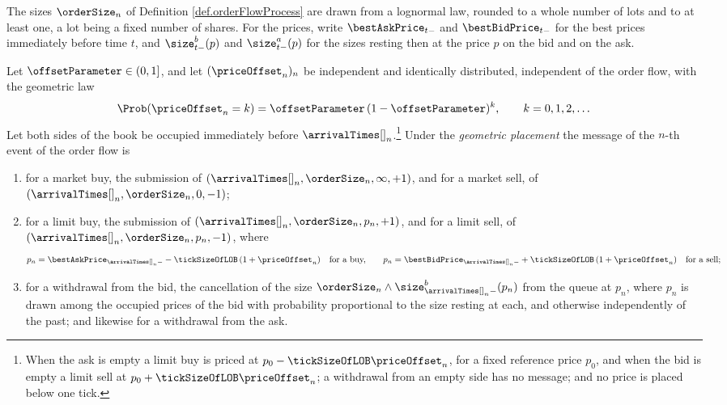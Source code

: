 The sizes $\orderSize_n$ of Definition \ref{def.orderFlowProcess} are drawn from a
lognormal law, rounded to a whole number of lots and to at least one,
a lot being a fixed number of shares.
For the prices,
write $\bestAskPrice_{t-}$ and $\bestBidPrice_{t-}$ for the best prices immediately before
time $t$,
and $\size^{b}_{t-}(p)$ and $\size^{a}_{t-}(p)$ for the sizes resting then at the price $p$
on the bid and on the ask.

\begin{defi}\label{def.geometricPlacement}
 Let $\offsetParameter \in (0,1]$,
 and let $(\priceOffset_n)_n$ be independent and identically distributed,
 independent of the order flow, with the geometric law
 \begin{equation}\label{eq.priceOffset}
  \Prob(\priceOffset_n = k) = \offsetParameter \, (1-\offsetParameter)^{k},
  \qquad k = 0, 1, 2, \dots
 \end{equation}
 Let both sides of the book be occupied immediately before
 $\arrivalTimes[]_n$.\footnote{When
 the ask is empty a limit buy is priced at $p_0 - \tickSizeOfLOB\priceOffset_n$,
 for a fixed reference price $p_0$,
 and when the bid is empty a limit sell at $p_0 + \tickSizeOfLOB\priceOffset_n$;
 a withdrawal from an empty side has no message;
 and no price is placed below one tick.}
 Under the \emph{geometric placement} the message of the $n$-th event of the order flow is
 \begin{enumerate}[label={\emph{\roman{*}}.}]
  \item for a market buy, the submission of
        $(\arrivalTimes[]_n, \orderSize_n, \infty, +1)$,
        and for a market sell, of $(\arrivalTimes[]_n, \orderSize_n, 0, -1)$;
  \item for a limit buy, the submission of $(\arrivalTimes[]_n, \orderSize_n, p_n, +1)$,
        and for a limit sell, of $(\arrivalTimes[]_n, \orderSize_n, p_n, -1)$, where
        \begin{equation}\label{eq.limitPrice}
         p_n = \bestAskPrice_{\arrivalTimes[]_n-}
         - \tickSizeOfLOB \, (1 + \priceOffset_n)
         \quad \text{for a buy,}
         \qquad
         p_n = \bestBidPrice_{\arrivalTimes[]_n-}
         + \tickSizeOfLOB \, (1 + \priceOffset_n)
         \quad \text{for a sell;}
        \end{equation}
  \item for a withdrawal from the bid, the cancellation of the size
        $\orderSize_n \wedge \size^{b}_{\arrivalTimes[]_n-}(p_n)$
        from the queue at $p_n$,
        where $p_n$ is drawn among the occupied prices of the bid
        with probability proportional to the size resting at each,
        and otherwise independently of the past;
        and likewise for a withdrawal from the ask.
 \end{enumerate}
\end{defi}

